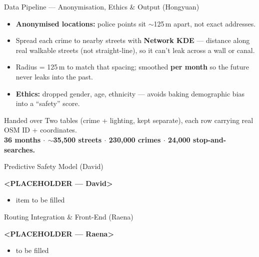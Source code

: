 \documentclass{beamer}
\begin{document}
\begin{frame}{Data Pipeline --- Anonymisation, Ethics \& Output \hfill \small(Hongyuan)}
  \begin{itemize}
    \item \textbf{Anonymised locations:} police points sit $\sim$125\,m apart, not exact addresses.
    \item Spread each crime to nearby streets with \textbf{Network KDE} --- distance along real walkable streets (not straight-line), so it can't leak across a wall or canal.
    \item Radius = 125\,m to match that spacing; smoothed \textbf{per month} so the future never leaks into the past.
    \item \textbf{Ethics:} dropped gender, age, ethnicity --- avoids baking demographic bias into a ``safety'' score.
  \end{itemize}
  \vspace{0.3em}
  \begin{block}{Handed over}
    Two tables (crime + lighting, kept separate), each row carrying real OSM ID + coordinates.\\
    \textbf{36 months $\cdot$ $\sim$35,500 streets $\cdot$ 230,000 crimes $\cdot$ 24,000 stop-and-searches.}
  \end{block}
\end{frame}

\begin{frame}{Predictive Safety Model \hfill \small(David)}
  \begin{center}
    \textbf{<PLACEHOLDER --- David>}
  \end{center}
  \begin{itemize}
  \item item to be filled
  \end{itemize}
\end{frame}

\begin{frame}{Routing Integration \& Front-End \hfill \small(Raena)}
  \begin{center}
    \textbf{<PLACEHOLDER --- Raena>}
  \end{center}
  \begin{itemize}
  \item to be filled
  \end{itemize}
\end{frame}
\end{document}
